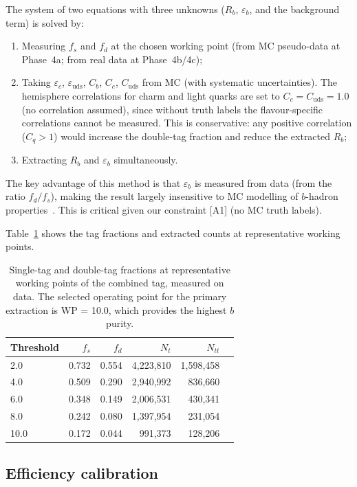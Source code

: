 \documentclass[11pt,a4paper]{article}
\begin{document}
The system of two equations with three unknowns ($R_b$, $\varepsilon_b$, and the
background term) is solved by:
\begin{enumerate}
\item Measuring $f_s$ and $f_d$ at the chosen working point (from MC pseudo-data
at Phase~4a; from real data at Phase~4b/4c);
\item Taking $\varepsilon_c$, $\varepsilon_\mathrm{uds}$, $C_b$, $C_c$, $C_\mathrm{uds}$
from MC (with systematic uncertainties). The hemisphere correlations for charm
and light quarks are set to $C_c = C_\mathrm{uds} = 1.0$ (no correlation assumed),
since without truth labels the flavour-specific correlations cannot be measured.
This is conservative: any positive correlation ($C_q > 1$) would increase the
double-tag fraction and reduce the extracted $R_b$;
\item Extracting $R_b$ and $\varepsilon_b$ simultaneously.
\end{enumerate}

The key advantage of this method is that $\varepsilon_b$ is measured from data (from
the ratio $f_d / f_s$), making the result largely insensitive to MC modelling of
$b$-hadron properties~\cite{ALEPH:Rb:1996, LEP:HF:2001}. This is critical given
our constraint [A1] (no MC truth labels).

Table~\ref{tab:working_points} shows the tag fractions and extracted counts at
representative working points.

\begin{table}[htbp]
\centering
\caption{Single-tag and double-tag fractions at representative working points of
the combined tag, measured on data. The selected operating point for the primary
extraction is WP = 10.0, which provides the highest $b$ purity.}
\label{tab:working_points}
\begin{tabular}{lrrrrr}
\toprule
Threshold & $f_s$ & $f_d$ & $N_t$ & $N_{tt}$ \\
\midrule
2.0 & 0.732 & 0.554 & 4,223,810 & 1,598,458 \\
4.0 & 0.509 & 0.290 & 2,940,992 & 836,660 \\
6.0 & 0.348 & 0.149 & 2,006,531 & 430,341 \\
8.0 & 0.242 & 0.080 & 1,397,954 & 231,054 \\
10.0 & 0.172 & 0.044 & 991,373 & 128,206 \\
\bottomrule
\end{tabular}
\end{table}

\subsection{Efficiency calibration}
\label{sec:calibration}
\end{document}
